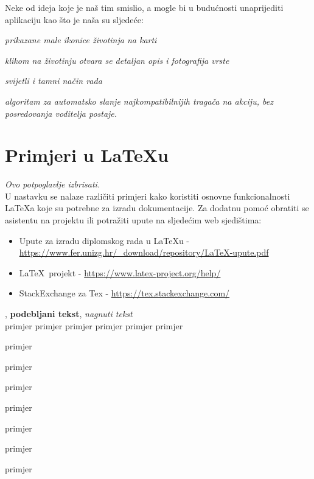 		Neke od ideja koje je naš tim smislio, a mogle bi u budućnosti unaprijediti aplikaciju kao što je naša su sljedeće:
		\begin{packed_item}
			\item \textit{prikazane male ikonice životinja na karti}
			\item \textit{klikom na životinju otvara se detaljan opis i fotografija vrste}
			\item \textit{svijetli i tamni način rada}
			\item \textit{algoritam za automatsko slanje najkompatibilnijih tragača na akciju, bez posredovanja voditelja postaje.}
		\end{packed_item}
		
		
		\section{Primjeri u \LaTeX u}
		
		\textit{Ovo potpoglavlje izbrisati.}\\

		U nastavku se nalaze različiti primjeri kako koristiti osnovne funkcionalnosti \LaTeX a koje su potrebne za izradu dokumentacije. Za dodatnu pomoć obratiti se asistentu na projektu ili potražiti upute na sljedećim web sjedištima:
		\begin{itemize}
			\item Upute za izradu diplomskog rada u \LaTeX u - \url{https://www.fer.unizg.hr/_download/repository/LaTeX-upute.pdf}
			\item \LaTeX\ projekt - \url{https://www.latex-project.org/help/}
			\item StackExchange za Tex - \url{https://tex.stackexchange.com/}\\
		
		\end{itemize} 	


		
		\noindent {}, \textbf{podebljani tekst}, 	\textit{nagnuti tekst}\\
		\noindent \normalsize primjer \large primjer \Large primjer \LARGE {primjer} \huge {primjer} \Huge primjer \normalsize
				
		\begin{packed_item}
			
			\item  primjer
			\item  primjer
			\item  primjer
			\item[] \begin{packed_enum}
				\item primjer
				\item[] \begin{packed_enum}
					\item[1.a] primjer
					\item[b] primjer
				\end{packed_enum}
				\item primjer
			\end{packed_enum}
			
		\end{packed_item}
		
